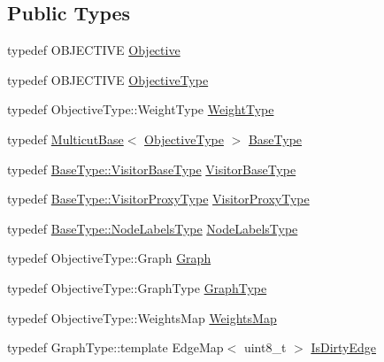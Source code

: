 \subsection*{Public Types}
\begin{DoxyCompactItemize}
\item 
typedef O\+B\+J\+E\+C\+T\+I\+V\+E \hyperlink{classnifty_1_1graph_1_1optimization_1_1multicut_1_1KernighanLin_abf00a316ed89c91b44806040d63757fd}{Objective}
\item 
typedef O\+B\+J\+E\+C\+T\+I\+V\+E \hyperlink{classnifty_1_1graph_1_1optimization_1_1multicut_1_1KernighanLin_abef51ef3e7e72953f476ed3de3cf2d09}{Objective\+Type}
\item 
typedef Objective\+Type\+::\+Weight\+Type \hyperlink{classnifty_1_1graph_1_1optimization_1_1multicut_1_1KernighanLin_af857f94087fd9ab85ceda670e1676ad6}{Weight\+Type}
\item 
typedef \hyperlink{classnifty_1_1graph_1_1optimization_1_1multicut_1_1MulticutBase}{Multicut\+Base}$<$ \hyperlink{classnifty_1_1graph_1_1optimization_1_1multicut_1_1KernighanLin_abef51ef3e7e72953f476ed3de3cf2d09}{Objective\+Type} $>$ \hyperlink{classnifty_1_1graph_1_1optimization_1_1multicut_1_1KernighanLin_ab6d19e937f045f7b69767fc14a77b75a}{Base\+Type}
\item 
typedef \hyperlink{classnifty_1_1graph_1_1optimization_1_1common_1_1SolverBase_a5a14d64c70a9cc0eebc7d71d2b089f9b}{Base\+Type\+::\+Visitor\+Base\+Type} \hyperlink{classnifty_1_1graph_1_1optimization_1_1multicut_1_1KernighanLin_af81a8d0ada4683cfb667a2ed2b47a2c1}{Visitor\+Base\+Type}
\item 
typedef \hyperlink{classnifty_1_1graph_1_1optimization_1_1common_1_1SolverBase_a58913ea9ab9232ff72608b710c1012d0}{Base\+Type\+::\+Visitor\+Proxy\+Type} \hyperlink{classnifty_1_1graph_1_1optimization_1_1multicut_1_1KernighanLin_a633a30d53d3f5fa12742d9ba5a8d0326}{Visitor\+Proxy\+Type}
\item 
typedef \hyperlink{classnifty_1_1graph_1_1optimization_1_1common_1_1SolverBase_a6e4e465f3b6e039882669fcfb9714818}{Base\+Type\+::\+Node\+Labels\+Type} \hyperlink{classnifty_1_1graph_1_1optimization_1_1multicut_1_1KernighanLin_a40cce2b5f9facb3e70c3bc6c6616ba6e}{Node\+Labels\+Type}
\item 
typedef Objective\+Type\+::\+Graph \hyperlink{classnifty_1_1graph_1_1optimization_1_1multicut_1_1KernighanLin_addadbdf5ec72ed5a560ddf3ddd00247d}{Graph}
\item 
typedef Objective\+Type\+::\+Graph\+Type \hyperlink{classnifty_1_1graph_1_1optimization_1_1multicut_1_1KernighanLin_a73f825f093cf1738ca9c57f3fd2eb71d}{Graph\+Type}
\item 
typedef Objective\+Type\+::\+Weights\+Map \hyperlink{classnifty_1_1graph_1_1optimization_1_1multicut_1_1KernighanLin_a5652d538fb3fd926ae5c514aadd48529}{Weights\+Map}
\item 
typedef Graph\+Type\+::template Edge\+Map$<$ uint8\+\_\+t $>$ \hyperlink{classnifty_1_1graph_1_1optimization_1_1multicut_1_1KernighanLin_a1e754b856f021f4cc312c03d833fb90f}{Is\+Dirty\+Edge}
\end{DoxyCompactItemize}
